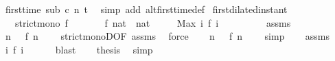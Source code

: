 \begin{isabellebody}
\ {\isacartoucheopen}first{\isacharunderscore}time\ sub\ c\ n\ t{\isacartoucheclose}\ \isamarkupfalse%
\ {\isacharparenleft}simp\ add{\isacharcolon}\ alt{\isacharunderscore}first{\isacharunderscore}time{\isacharunderscore}def{\isacharparenright}\isanewline
{}\isamarkupfalse%
%
\endisatagproof
{\isafoldproof}%
%
\isadelimproof
\isanewline
%
\endisadelimproof
\isanewline
{}\isamarkupfalse%
\ first{\isacharunderscore}dilated{\isacharunderscore}instant{\isacharcolon}\isanewline
\ \ \ {\isacartoucheopen}strict{\isacharunderscore}mono\ f{\isacartoucheclose}\isanewline
\ \ \ \ \ \ \ {\isacartoucheopen}f\ {\isacharparenleft}{}{\isacharcolon}{\isacharcolon}nat{\isacharparenright}\ {\isacharequal}\ {\isacharparenleft}{}{\isacharcolon}{\isacharcolon}nat{\isacharparenright}{\isacartoucheclose}\isanewline
\ \ \ \ \ {\isacartoucheopen}Max\ {\isacharbraceleft}i{\isachardot}\ f\ i\ {\isasymle}\ {}{\isacharbraceright}\ {\isacharequal}\ {}{\isacartoucheclose}\isanewline
%
\isadelimproof
%
\endisadelimproof
%
\isatagproof
{}\isamarkupfalse%
\ {\isacharminus}\isanewline
\ \ \isamarkupfalse%
\ assms{\isacharparenleft}{}{\isacharparenright}\ \isamarkupfalse%
\ {\isacartoucheopen}{\isasymforall}n\ {\isachargreater}\ {}{\isachardot}\ f\ n\ {\isachargreater}\ {}{\isacartoucheclose}\ \isamarkupfalse%
\ strict{\isacharunderscore}monoD{\isacharbrackleft}OF\ assms{\isacharparenleft}{}{\isacharparenright}{\isacharbrackright}\ \isamarkupfalse%
\ force\isanewline
\ \ \isamarkupfalse%
\ {\isacartoucheopen}{\isasymforall}n\ {\isasymnoteq}\ {}{\isachardot}\ {\isasymnot}{\isacharparenleft}f\ n\ {\isasymle}\ {}{\isacharparenright}{\isacartoucheclose}\ \isamarkupfalse%
\ simp\isanewline
\ \ \isamarkupfalse%
\ assms{\isacharparenleft}{}{\isacharparenright}\ \isamarkupfalse%
\ {\isacartoucheopen}{\isacharbraceleft}i{\isachardot}\ f\ i\ {\isasymle}\ {}{\isacharbraceright}\ {\isacharequal}\ {\isacharbraceleft}{}{\isacharbraceright}{\isacartoucheclose}\ \isamarkupfalse%
\ blast\isanewline
\ \ \isamarkupfalse%
\ {\isacharquery}thesis\ \isamarkupfalse%
\ simp\isanewline
{}\isamarkupfalse%
%
\endisatagproof
{\isafoldproof}%
%
\isadelimproof
\isanewline

\end{isabellebody}
